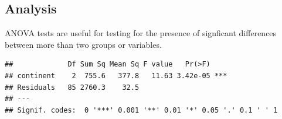 \documentclass[]{book}
\makeatletter
\newenvironment{Shaded}{\begin{snugshade}}{\end{snugshade}}
\newcommand{\KeywordTok}[1]{\textcolor[rgb]{0.13,0.29,0.53}{\textbf{#1}}}
\newcommand{\DataTypeTok}[1]{\textcolor[rgb]{0.13,0.29,0.53}{#1}}
\newcommand{\DecValTok}[1]{\textcolor[rgb]{0.00,0.00,0.81}{#1}}
\newcommand{\StringTok}[1]{\textcolor[rgb]{0.31,0.60,0.02}{#1}}
\newcommand{\OperatorTok}[1]{\textcolor[rgb]{0.81,0.36,0.00}{\textbf{#1}}}
\newcommand{\NormalTok}[1]{#1}
\newenvironment{kframe}{%
\medskip{}
\setlength{\fboxsep}{.8em}
 \def\at@end@of@kframe{}%
 \ifinner\ifhmode%
  \def\at@end@of@kframe{\end{minipage}}%
  \begin{minipage}{\columnwidth}%
 \fi\fi%
 \def\FrameCommand##1{\hskip\@totalleftmargin \hskip-\fboxsep
 \colorbox{shadecolor}{##1}\hskip-\fboxsep
     \hskip-\linewidth \hskip-\@totalleftmargin \hskip\columnwidth}%
 \MakeFramed {\advance\hsize-\width
   \@totalleftmargin\z@ \linewidth\hsize
   \@setminipage}}%
 {\par\unskip\endMakeFramed%
 \at@end@of@kframe}
\renewenvironment{Shaded}{\begin{kframe}}{\end{kframe}}
\makeatother
\begin{document}
\subsection{Analysis}\label{analysis}

ANOVA tests are useful for testing for the presence of signficant
differences between more than two groups or variables.

\begin{Shaded}
\end{Shaded}

\begin{verbatim}
##             Df Sum Sq Mean Sq F value   Pr(>F)    
## continent    2  755.6   377.8   11.63 3.42e-05 ***
## Residuals   85 2760.3    32.5                     
## ---
## Signif. codes:  0 '***' 0.001 '**' 0.01 '*' 0.05 '.' 0.1 ' ' 1
\end{verbatim}

\begin{Shaded}
\end{Shaded}
\end{document}
